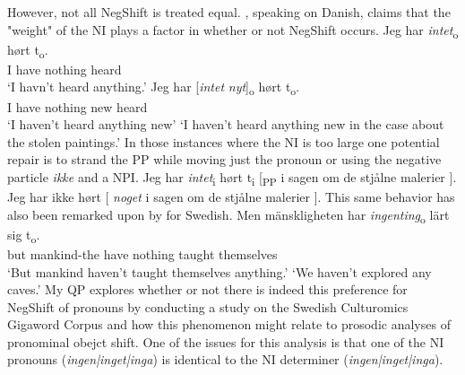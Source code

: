 \documentclass[12pt, letterpaper]{article}
\begin{document}
\newpage
\ex However, not all NegShift is treated equal. \citet[65f]{christensenInterfacesNegationSyntax2005}, speaking on Danish, claims that the "weight" of the NI plays a factor in whether or not NegShift occurs. 
	\ea
	\gll Jeg har \textit{intet}\textsubscript{o} hørt t\textsubscript{o}.\\
	I have nothing heard\\
	\glt  `I havn't heard anything.'
	\ex 
	\gll Jeg har [\textit{intet} \textit{nyt}]\textsubscript{o} hørt t\textsubscript{o}.\\
	I have nothing new heard\\
	\glt `I haven't heard anything new'
	\glt `I haven't heard anything new in the case about the stolen paintings.'
	\z
\ex In those instances where the NI is too large one potential repair is to strand the PP while moving just the pronoun or using the negative particle \textit{ikke} and a NPI.
	\ea Jeg har \textit{intet}\textsubscript{i} hørt t\textsubscript{i} [\textsubscript{PP} i sagen om de stjålne malerier ].
	\ex Jeg har ikke hørt [ \textit{noget} i sagen om de stjålne malerier ].
	\z   
\ex This same behavior has also been remarked upon by \citet{penkaNegativeIndefinites2011} for Swedish.
	\ea 
	\gll Men mänskligheten har \textit{ingenting}\textsubscript{o} lärt sig t\textsubscript{o}.\\
	but mankind-the have nothing taught themselves\\
	\glt `But mankind haven't taught themselves anything.'
	\glt `We haven't explored any caves.'
	\z 
\ex My QP explores whether or not there is indeed this preference for NegShift of pronouns by conducting a study on the Swedish Culturomics Gigaword Corpus \citep{eideSwedishCulturomicsGigaword2016} and how this phenomenon might relate to prosodic analyses of pronominal obejct shift.
\ex One of the issues for this analysis is that one of the NI pronouns (\textit{ingen|inget|inga}) is identical to the NI determiner (\textit{ingen|inget|inga}).
\z 
\end{document}
